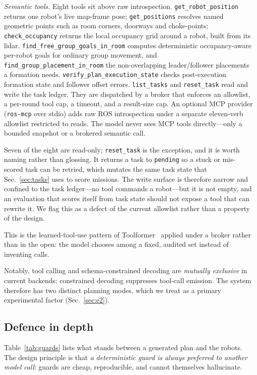 \documentclass[10pt,twocolumn]{article}
\newcommand{\code}[1]{\texttt{\small #1}}
\begin{document}
\emph{Semantic tools.} Eight tools sit above raw introspection.
\code{get\_robot\_position} returns one robot's live map-frame pose;
\code{get\_positions} resolves named geometric points such as room corners,
doorways and choke-points; \code{check\_occupancy} returns the local occupancy
grid around a robot, built from its lidar.
\code{find\_free\_group\_goals\_in\_room} computes deterministic
occupancy-aware per-robot goals for ordinary group movement, and
\code{find\_group\_placement\_in\_room} the non-overlapping leader/follower
placements a formation needs. \code{verify\_plan\_execution\_state} checks
post-execution formation state and follower offset errors. \code{list\_tasks}
and \code{reset\_task} read and write the task ledger. They are dispatched
by a broker that enforces an allowlist, a per-round tool cap, a timeout, and a
result-size cap. An optional MCP provider (\code{ros-mcp} over stdio) adds raw
ROS introspection under a separate eleven-verb allowlist restricted to reads.
The model never sees MCP tools directly---only a bounded snapshot or a brokered
semantic call.

Seven of the eight are read-only; \code{reset\_task} is the exception, and it is
worth naming rather than glossing. It returns a task to \code{pending} so a
stuck or mis-scored task can be retried, which mutates the same task state that
Sec.~\ref{sec:tasks} uses to score missions. The write surface is therefore
narrow and confined to the task ledger---no tool commands a robot---but it is
not empty, and an evaluation that scores itself from task state should not
expose a tool that can rewrite it. We flag this as a defect of the current
allowlist rather than a property of the design.

This is the learned-tool-use pattern of Toolformer~\cite{toolformer} applied
under a broker rather than in the open: the model chooses among a fixed,
audited set instead of inventing calls.

Notably, tool calling and schema-constrained decoding are \emph{mutually
exclusive} in current backends: constrained decoding suppresses tool-call
emission. The system therefore has two distinct planning modes, which we treat
as a primary experimental factor (Sec.~\ref{sec:e2}).

\subsection{Defence in depth}
\label{sec:guards}

Table~\ref{tab:guards} lists what stands between a generated plan and the
robots. The design principle is that \emph{a deterministic guard is always
preferred to another model call}: guards are cheap, reproducible, and cannot
themselves hallucinate.
\end{document}

